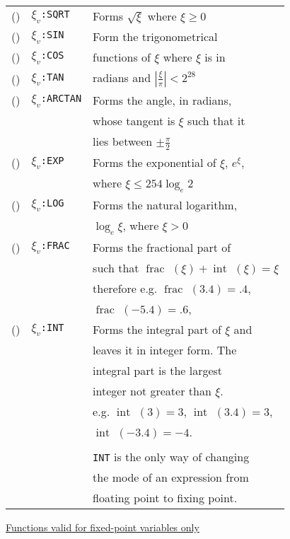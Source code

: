 \documentclass[10pt, a4paper, oneside]{article}
\newcommand{\myuline}[1]{\uline{#1}}
\newcommand{\mytt}[1]{\texttt{\scriptsize #1}}
\newcommand{\mytt}[1]{\texttt{\small #1}}
\newcounter{RowCounter}
\newcommand{\nextRow}{\addtocounter{RowCounter}{1}(\roman{RowCounter})}
\DeclareMathOperator{\Int}{int\ }
\DeclareMathOperator{\Frac}{frac\ }
\begin{document}
\begin{multicols}{2}
\begin{enumerate}
\begin{minipage}{\columnwidth}
\setcounter{RowCounter}{0}
\begin{tabular}{rll}
\nextRow & $\xi_{v}$\mytt{:SQRT} & Forms $\sqrt{\xi}$ where $\xi \geqslant 0$ \\
\nextRow & $\xi_{v}$\mytt{:SIN}  & \multicolumn{1}{|l}{Form the trigonometrical} \\
\nextRow & $\xi_{v}$\mytt{:COS}  & \multicolumn{1}{|l}{functions of $\xi$ where $\xi$ is in} \\
\nextRow & $\xi_{v}$\mytt{:TAN}  & \multicolumn{1}{|l}{radians and $|\frac{\xi}{\pi}| < 2^{28}$} \\
\nextRow & $\xi_{v}$\mytt{:ARCTAN} & Forms the angle, in radians, \\
  & & whose tangent is $\xi$ such that it \\
  & & lies between $\pm\frac{\pi}{2}$ \\
\nextRow & $\xi_{v}$\mytt{:EXP}  & Forms the exponential of $\xi$, $e^{\xi}$, \\
  & & where $\xi \leqslant 254 \log_{e}2$ \\
\nextRow & $\xi_{v}$\mytt{:LOG}  & Forms the natural logarithm, \\
  & & $\log_{e}\xi$,  where $\xi > 0$ \\
\nextRow & $\xi_{v}$\mytt{:FRAC} & Forms the fractional part of \\
  & & such that $\Frac (\xi) + \Int (\xi) = \xi$ \\
  & & therefore e.g. $\Frac (3.4) = .4$, \\
  & & $\Frac (-5.4) = .6$, \\
\nextRow & $\xi_{v}$\mytt{:INT}  & Forms the integral part of $\xi$ and \\
  & & leaves it in integer form.  The \\
  & & integral part is the largest \\
  & & integer not greater than $\xi$. \\
  & & e.g. $\Int (3) = 3$, $\Int (3.4) = 3$, \\
  & & $\Int (-3.4) = -4$. \\
  & & \\
  & & \mytt{INT} is the only way of changing \\
  & & the mode of an expression from \\
  & & floating point to fixing point. \\
\end{tabular}
\end{minipage}

\begin{minipage}{\columnwidth}
\item \myuline{Functions valid for fixed-point variables only}


\end{minipage}
\end{enumerate}
\end{multicols}
\end{document}
